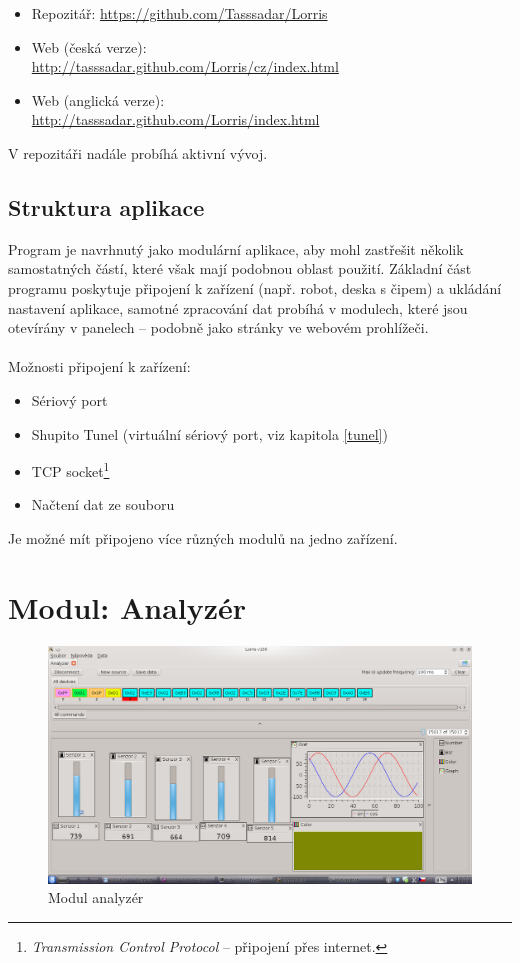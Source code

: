 \documentclass[12pt, a4paper, oneside]{article}
\newcommand{\It}{\textit}  %
\begin{document}
\begin{itemize}
    \item Repozitář: \url{https://github.com/Tasssadar/Lorris}
    \item Web (česká verze):\\ \url{http://tasssadar.github.com/Lorris/cz/index.html}
    \item Web (anglická verze):\\ \url{http://tasssadar.github.com/Lorris/index.html}
\end{itemize}
V repozitáři nadále probíhá aktivní vývoj.

\subsection{Struktura aplikace}
Program je navrhnutý jako modulární aplikace, aby mohl zastřešit několik samostatných částí, které však mají podobnou oblast použití. Základní část programu poskytuje připojení k zařízení (např. robot, deska s čipem) a ukládání nastavení aplikace, samotné zpracování dat probíhá v modulech, které jsou otevírány v panelech -- podobně jako stránky ve webovém prohlížeči.\\
\\
Možnosti připojení k zařízení:
\begin{itemize}
    \item Sériový port
    \item Shupito Tunel (virtuální sériový port, viz kapitola \ref{tunel})
    \item TCP socket\footnote{\It{Transmission Control Protocol} -- připojení přes internet.}
    \item Načtení dat ze souboru
\end{itemize}
Je možné mít připojeno více různých modulů na jedno zařízení.  

\newpage
\section{Modul: Analyzér}

\begin{figure}[h]
\begin{center}
\includegraphics[width=\textwidth]{img/analyzer_all.png}
\caption{Modul analyzér}
\label{Analyzer}
\end{center}
\end{figure}
\end{document}
